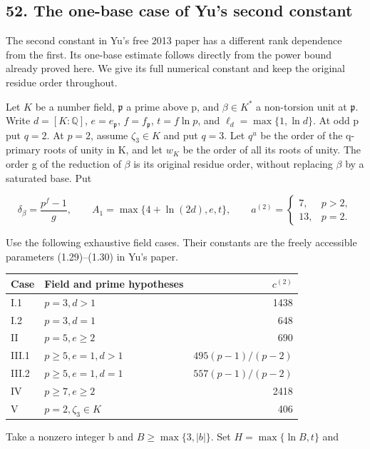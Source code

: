 \documentclass[
  11pt,
  a4paper,
]{article}
\newcounter{none} %
\begin{document}
\subsection{52. The one-base case of Yu's second
constant}\label{the-one-base-case-of-yus-second-constant}

The second constant in Yu's free 2013 paper has a different rank
dependence from the first. Its one-base estimate follows directly from
the power bound already proved here. We give its full numerical constant
and keep the original residue order throughout.

Let \(K\) be a number field, \(\mathfrak p\) a prime above p, and
\(\beta\in K^*\) a non-torsion unit at \(\mathfrak p\). Write
\(d=[K:\mathbb Q]\), \(e=e_{\mathfrak p}\), \(f=f_{\mathfrak p}\),
\(t=f\ln p\), and \(\ell_d=\max\{1,\ln d\}\). At odd p put \(q=2\). At
\(p=2\), assume \(\zeta_3\in K\) and put \(q=3\). Let \(q^u\) be the
order of the q-primary roots of unity in K, and let \(w_K\) be the order
of all its roots of unity. The order g of the reduction of \(\beta\) is
its original residue order, without replacing \(\beta\) by a saturated
base. Put

\[
\delta_\beta=\frac{p^f-1}{g},\qquad
A_1=\max\{4+\ln(2d),e,t\},\qquad
a^{(2)}=\begin{cases}7,&p>2,\\13,&p=2.\end{cases}
\tag{10.518}
\]

Use the following exhaustive field cases. Their constants are the freely
accessible parameters (1.29)--(1.30) in Yu's paper.

{\def\LTcaptype{none} %
\begin{longtable}[]{@{}llr@{}}
\toprule\noalign{}
Case & Field and prime hypotheses & \(c^{(2)}\) \\
\midrule\noalign{}
\endhead
\bottomrule\noalign{}
\endlastfoot
I.1 & \(p=3,d>1\) & 1438 \\
I.2 & \(p=3,d=1\) & 648 \\
II & \(p=5,e\ge2\) & 690 \\
III.1 & \(p\ge5,e=1,d>1\) & \(495(p-1)/(p-2)\) \\
III.2 & \(p\ge5,e=1,d=1\) & \(557(p-1)/(p-2)\) \\
IV & \(p\ge7,e\ge2\) & 2418 \\
V & \(p=2,\zeta_3\in K\) & 406 \\
\end{longtable}
}

Take a nonzero integer b and \(B\ge\max\{3,|b|\}\). Set
\(H=\max\{\ln B,t\}\) and
\end{document}
